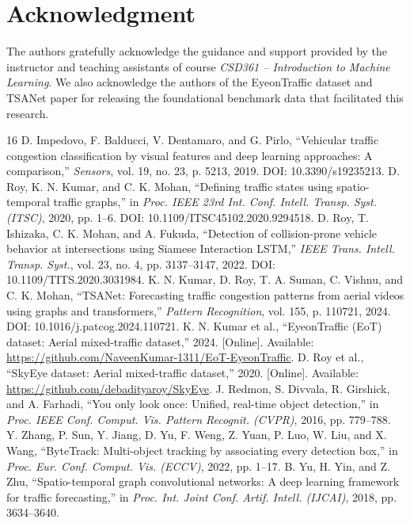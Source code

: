 \documentclass[conference]{IEEEtran}
\begin{document}
\section*{Acknowledgment}
The authors gratefully acknowledge the guidance and support provided by the instructor and teaching assistants of course \textit{CSD361 -- Introduction to Machine Learning}. We also acknowledge the authors of the EyeonTraffic dataset and TSANet paper for releasing the foundational benchmark data that facilitated this research.

\begin{thebibliography}{16}
 D. Impedovo, F. Balducci, V. Dentamaro, and G. Pirlo, ``Vehicular traffic congestion classification by visual features and deep learning approaches: A comparison,'' \textit{Sensors}, vol. 19, no. 23, p. 5213, 2019. DOI: 10.3390/s19235213.
 D. Roy, K. N. Kumar, and C. K. Mohan, ``Defining traffic states using spatio-temporal traffic graphs,'' in \textit{Proc. IEEE 23rd Int. Conf. Intell. Transp. Syst. (ITSC)}, 2020, pp. 1--6. DOI: 10.1109/ITSC45102.2020.9294518.
 D. Roy, T. Ishizaka, C. K. Mohan, and A. Fukuda, ``Detection of collision-prone vehicle behavior at intersections using Siamese Interaction LSTM,'' \textit{IEEE Trans. Intell. Transp. Syst.}, vol. 23, no. 4, pp. 3137--3147, 2022. DOI: 10.1109/TITS.2020.3031984.
 K. N. Kumar, D. Roy, T. A. Suman, C. Vishnu, and C. K. Mohan, ``TSANet: Forecasting traffic congestion patterns from aerial videos using graphs and transformers,'' \textit{Pattern Recognition}, vol. 155, p. 110721, 2024. DOI: 10.1016/j.patcog.2024.110721.
 K. N. Kumar et al., ``EyeonTraffic (EoT) dataset: Aerial mixed-traffic dataset,'' 2024. [Online]. Available: \url{https://github.com/NaveenKumar-1311/EoT-EyeonTraffic}.
 D. Roy et al., ``SkyEye dataset: Aerial mixed-traffic dataset,'' 2020. [Online]. Available: \url{https://github.com/debadityaroy/SkyEye}.
 J. Redmon, S. Divvala, R. Girshick, and A. Farhadi, ``You only look once: Unified, real-time object detection,'' in \textit{Proc. IEEE Conf. Comput. Vis. Pattern Recognit. (CVPR)}, 2016, pp. 779--788.
 Y. Zhang, P. Sun, Y. Jiang, D. Yu, F. Weng, Z. Yuan, P. Luo, W. Liu, and X. Wang, ``ByteTrack: Multi-object tracking by associating every detection box,'' in \textit{Proc. Eur. Conf. Comput. Vis. (ECCV)}, 2022, pp. 1--17.
 B. Yu, H. Yin, and Z. Zhu, ``Spatio-temporal graph convolutional networks: A deep learning framework for traffic forecasting,'' in \textit{Proc. Int. Joint Conf. Artif. Intell. (IJCAI)}, 2018, pp. 3634--3640.

\end{thebibliography}
\end{document}
